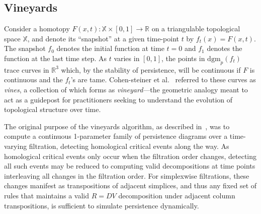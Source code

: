 \documentclass[sn-mathphys]{sn-jnl}
\begin{document}
\subsection{Vineyards}\label{sec:vineyards}
Consider a homotopy $F(x,t) : \mathbb{X} \times [0,1] \to \mathbb{R}$ on a triangulable topological space $\mathbb{X}$, and denote its ``snapshot'' at a given time-point $t$ by $f_t(x) = F(x,t)$.
The snapshot $f_0$ denotes the initial function at time $t = 0$ and $f_1$ denotes the function at the last time step. 
As $t$ varies in $[0,1]$, the points in $\mathrm{dgm}_p(f_t)$ trace curves in $\mathbb{R}^3$ which, by the stability of persistence, will be continuous if $F$ is continuous and the $f_t$'s are tame.
Cohen-steiner et al.~\cite{cohen2007stability} referred to these curves as \emph{vines}, a collection of which forms as \emph{vineyard}---the geometric analogy meant to act as a guidepost for practitioners seeking to understand the evolution of topological structure over time.

The original purpose of the vineyards algorithm, as described in~\cite{cohen2006vines}, was to compute a continuous 1-parameter family of persistence diagrams over a time-varying filtration, detecting homological critical events along the way.
As homological critical events only occur when the filtration order changes, detecting all such events may be reduced to computing valid decompositions at   time points interleaving all changes in the filtration order. 
For simplexwise filtrations, these changes manifest as transpositions of adjacent simplices, and thus any fixed set of rules that maintains a valid $R = D V$ decomposition under adjacent column transpositions, is sufficient to simulate persistence dynamically. 
\end{document}

